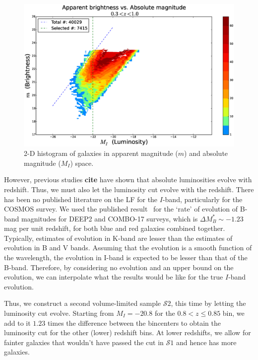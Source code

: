 \documentclass[twocolumn,useAMS,usenatbib]{mn2e}
\newcommand{\s}{\ensuremath{\mathcal{S}}}
\begin{document}
\begin{figure}
  \centering
   \includegraphics[width=\columnwidth]{hist2d_mag_mi}
   \caption{2-D histogram of galaxies in apparent magnitude ($m$) and absolute magnitude ($M_I$) space.}
   \label{fig:2Dhist}
 \end{figure}
 
However, previous studies {\bf cite} have shown that absolute luminosities evolve with redshift. Thus, we must also let the luminosity cut evolve with the redshift. 
There has been no published literature on the LF for the $I$-band, particularly for the COSMOS survey.
We used the published result~\citep{Faber2007} for the `rate' of evolution of B-band magnitudes for DEEP2 and COMBO-17 surveys, which is $ \Delta M_B^* \sim -1.23$ mag per unit redshift, for both blue and red galaxies combined together.
Typically, estimates of evolution in K-band are lesser than the estimates of evolution in B and V bands.
Assuming that the evolution is a smooth function of the wavelength, the evolution in I-band is expected to be lesser than that of the B-band. 
Therefore, by considering no evolution and an upper bound on the evolution, we can interpolate what the results would be like for the true $I$-band evolution.

Thus, we construct a second volume-limited sample \s$2$, this time by letting the luminosity cut evolve. Starting from $M_I = -20.8$ for the $0.8<z\le0.85$ bin, we add to it $1.23$ times the difference between the
bincenters to obtain the luminosity cut for the other (lower) redshift bins. At lower redshifts, we allow for fainter galaxies that wouldn't have passed the cut in \s$1$ and hence has more galaxies.
\end{document}

